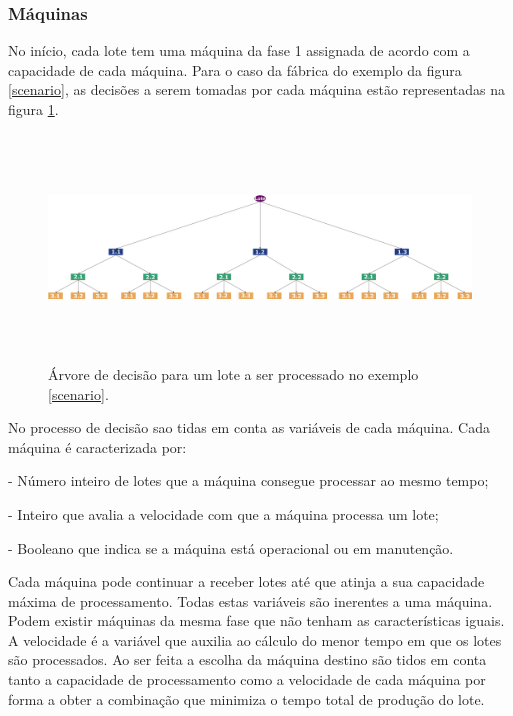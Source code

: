 \begin{titlepage}
\subsubsection{Máquinas}

No início, cada lote tem uma máquina da fase 1 assignada de acordo com a capacidade de cada máquina. Para o caso da fábrica do exemplo da figura \ref{scenario}, as decisões a serem tomadas por cada máquina estão representadas na figura \ref{decisionMach}.

\begin{figure}[H]
  \raggedleft 
    \includegraphics[width=19cm, height = 6cm]{DecisionTreeMachines.png}
  \caption{Árvore de decisão para um lote a ser processado no exemplo \ref{scenario}.}
  \label{decisionMach}
\end{figure}

No processo de decisão sao tidas em conta as variáveis de cada máquina. Cada máquina é caracterizada por:

\begin{description}
\item[Capacidade de Processamento] -  Número inteiro de lotes que a máquina consegue processar ao mesmo tempo;
\item[Velocidade de Processamento] - Inteiro que avalia a velocidade com que a máquina processa um lote;
\item[Manutenção] - Booleano que indica se a máquina está operacional ou em manutenção.
\item
\end{description}

Cada máquina pode continuar a receber lotes até que atinja a sua capacidade máxima de processamento. Todas estas variáveis são inerentes a uma máquina. Podem existir máquinas da mesma fase que não tenham as características iguais. A velocidade é a variável que auxilia ao cálculo do menor tempo em que os lotes são processados. Ao ser feita a escolha da máquina destino são tidos em conta tanto a capacidade de processamento como a velocidade de cada máquina por forma a obter a combinação que minimiza o tempo total de produção do lote.


\end{titlepage}

